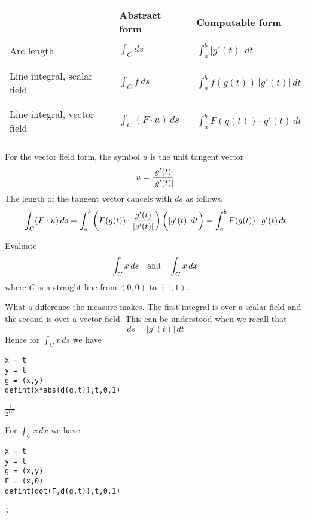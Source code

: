 \begin{center}
\begin{tabular}{|l|l|l|}
\hline
& Abstract form
& Computable form
\\
\hline
 & &\\
Arc length
& $\displaystyle{\int_C ds}$
& $\displaystyle{\int_a^b |g'(t)|\,dt}$\\
 & &\\
\hline
 & & \\
Line integral, scalar field
& $\displaystyle{\int_C f\,ds}$
& $\displaystyle{\int_a^b f(g(t))\,|g'(t)|\,dt}$\\
& &\\
\hline
 & & \\
Line integral, vector field
& $\displaystyle{\int_C(F\cdot u)\,ds}$
& $\displaystyle{\int_a^b F(g(t))\cdot g'(t)\,dt}$\\
 & & \\
\hline
\end{tabular}
\end{center}

\noindent
For the vector field form, the symbol $u$ is the unit tangent vector
$$u={g'(t)\over|g'(t)|}$$
The length of the tangent vector cancels with $ds$
as follows.
$$\int_C(F\cdot u)\,ds
=\int_a^b\bigg(F(g(t))\cdot{g'(t)\over|g'(t)|}\bigg)\,\bigg(|g'(t)|\,dt\bigg)
=\int_a^b F(g(t))\cdot g'(t)\,dt
$$

\noindent
Evaluate
$$\int_Cx\,ds\quad\hbox{and}\quad\int_Cx\,dx$$
where $C$ is a straight line from $(0,0)$ to $(1,1)$.

\bigskip
\noindent
What a difference the measure makes.
The first integral is over a scalar field and the second is over a vector field.
This can be understood when we recall that
$$ds=|g'(t)|\,dt
$$
Hence for $\int_Cx\,ds$ we have

\begin{Verbatim}[formatcom=\color{blue},samepage=true]
x = t
y = t
g = (x,y)
defint(x*abs(d(g,t)),t,0,1)
\end{Verbatim}

\noindent
$\displaystyle \frac{1}{2^{1/2}}$

\bigskip
\noindent
For $\int_Cx\,dx$ we have

\begin{Verbatim}[formatcom=\color{blue},samepage=true]
x = t
y = t
g = (x,y)
F = (x,0)
defint(dot(F,d(g,t)),t,0,1)
\end{Verbatim}

\noindent
$\displaystyle \tfrac{1}{2}$

